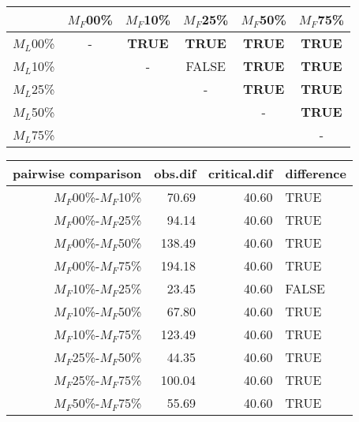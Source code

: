\begin{tabular}{c|ccccc}
    \hline
              & $M_F$00\% & $M_F$10\% & $M_F$25\% & $M_F$50\% & $M_F$75\% \\
    \hline
    $M_L$00\% & - & \textbf{TRUE} & \textbf{TRUE} & \textbf{TRUE} & \textbf{TRUE}\\
    $M_L$10\% & & - & FALSE & \textbf{TRUE} & \textbf{TRUE} \\
    $M_L$25\% & & & - & \textbf{TRUE} & \textbf{TRUE} \\
    $M_L$50\% & & & & - & \textbf{TRUE} \\
    $M_L$75\% & & & & & - \\
    \hline
\end{tabular}
\centering
\begin{tabular}{rrrl}
 pairwise comparison & obs.dif & critical.dif & difference \\ 
  \hline
  $M_F$00\%-$M_F$10\% & 70.69 & 40.60 & TRUE \\
  $M_F$00\%-$M_F$25\% & 94.14 & 40.60 & TRUE \\
  $M_F$00\%-$M_F$50\% & 138.49 & 40.60 & TRUE \\ 
  $M_F$00\%-$M_F$75\% & 194.18 & 40.60 & TRUE \\
  $M_F$10\%-$M_F$25\% & 23.45 & 40.60 & FALSE \\
  $M_F$10\%-$M_F$50\% & 67.80 & 40.60 & TRUE \\ 
  $M_F$10\%-$M_F$75\% & 123.49 & 40.60 & TRUE \\
  $M_F$25\%-$M_F$50\% & 44.35 & 40.60 & TRUE \\
  $M_F$25\%-$M_F$75\% & 100.04 & 40.60 & TRUE \\ 
  $M_F$50\%-$M_F$75\% & 55.69 & 40.60 & TRUE \\ 
   \hline
\end{tabular}
